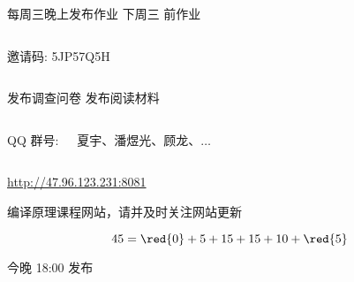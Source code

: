 \begin{frame}{}
  \begin{center}
    每周三晚上发布作业 \qquad 下周三  前作业
  \end{center}

  \begin{columns}
    \begin{center}
      邀请码: 5JP57Q5H
    \end{center}
  \end{columns}

  \vspace{0.30cm}
  \begin{center}
    发布调查问卷  \qquad\qquad 发布阅读材料
  \end{center}
\end{frame}

\begin{frame}{}
  \begin{columns}
    \begin{center}
      QQ 群号: 


    \end{center}
    \begin{center}
      {\bf {}} 夏宇、潘煜光、顾龙、$\dots$
    \end{center}
  \end{columns}
\end{frame}

\begin{frame}{}
  \begin{center}
    \url{http://47.96.123.231:8081} \\[5pt]


    编译原理课程网站，请并及时关注网站更新
  \end{center}
\end{frame}

\begin{frame}{}
  \[
    45 = \red{0} + 5 + 15 + 15 + 10 + \red{5}
  \]

  \vspace{0.30cm}

  \begin{center}
      今晚 18:00 发布
  \end{center}
\end{frame}


